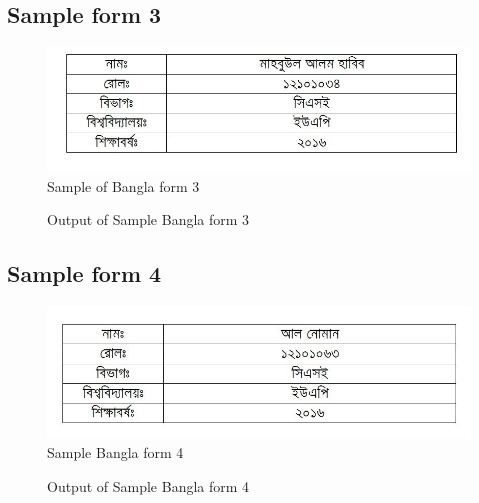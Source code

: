 \subsection{Sample form 3}
\begin{figure}[H]
\centering
\includegraphics[width=1\textwidth]{formBen03}
\caption {Sample of Bangla form 3}
\label {fig:FormBan3}
\end{figure}
\begin{figure}[H]
\centering
{}
\caption {Output of Sample Bangla form 3}
\label {fig:FormBanOut3}
\end{figure}
\subsection{Sample form 4}
\begin{figure}[H]
\centering
\includegraphics[width=1\textwidth]{formBen04}
\caption {Sample Bangla form 4}
\label {fig:FormBan4}
\end{figure}
\begin{figure}[H]
\centering
{}
\caption {Output of Sample Bangla form 4}
\label {fig:FormBanOut4}
\end{figure}
